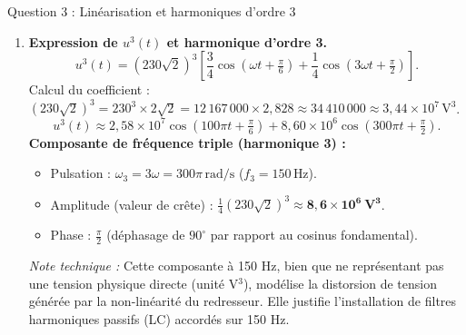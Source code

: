 \documentclass[11pt]{article}
\begin{document}
\begin{exoresolu}{Question 3 : Linéarisation et harmoniques d'ordre 3}
\begin{enumerate}
    \item \textbf{Expression de $u^3(t)$ et harmonique d'ordre 3.}
    \[
    u^3(t) = (230\sqrt{2})^3 \left[ \frac{3}{4}\cos(\omega t + \tfrac{\pi}{6}) + \frac{1}{4}\cos(3\omega t + \tfrac{\pi}{2}) \right].
    \]
    Calcul du coefficient : $(230\sqrt{2})^3 = 230^3 \times 2\sqrt{2} = 12\,167\,000 \times 2,828 \approx 34\,410\,000 \approx 3,44 \times 10^7\,\text{V}^3$.
    \[
    u^3(t) \approx 2,58 \times 10^7 \cos(100\pi t + \tfrac{\pi}{6}) + 8,60 \times 10^6 \cos(300\pi t + \tfrac{\pi}{2}).
    \]
    \textbf{Composante de fréquence triple (harmonique 3) :}
    \begin{itemize}
        \item Pulsation : $\omega_3 = 3\omega = 300\pi\,\text{rad/s}$ ($f_3 = 150\,\text{Hz}$).
        \item Amplitude (valeur de crête) : $\frac{1}{4}(230\sqrt{2})^3 \approx \mathbf{8,6 \times 10^6 \ \text{V}^3}$.
        \item Phase : $\frac{\pi}{2}$ (déphasage de $90^\circ$ par rapport au cosinus fondamental).
    \end{itemize}
    \emph{Note technique :} Cette composante à 150 Hz, bien que ne représentant pas une tension physique directe (unité V$^3$), modélise la distorsion de tension générée par la non-linéarité du redresseur. Elle justifie l'installation de filtres harmoniques passifs (LC) accordés sur 150 Hz.
\end{enumerate}
\end{exoresolu}
\end{document}
